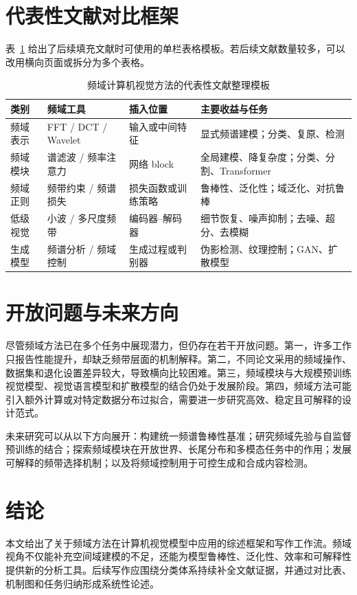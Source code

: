 \documentclass[12pt,a4paper]{article}
\begin{document}
\section{代表性文献对比框架}
表~\ref{tab:taxonomy} 给出了后续填充文献时可使用的单栏表格模板。若后续文献数量较多，可以改用横向页面或拆分为多个表格。

\begin{table}[htbp]
\centering
\caption{频域计算机视觉方法的代表性文献整理模板}
\label{tab:taxonomy}
\vspace{0.5em}
\small
\begin{tabular}{@{}p{2.4cm}p{3.2cm}p{3.0cm}p{3.6cm}@{}}
\toprule
\textbf{类别} & \textbf{频域工具} & \textbf{插入位置} & \textbf{主要收益与任务} \\ \midrule
频域表示 & FFT / DCT / Wavelet & 输入或中间特征 & 显式频谱建模；分类、复原、检测 \\
频域模块 & 谱滤波 / 频率注意力 & 网络 block & 全局建模、降复杂度；分类、分割、Transformer \\
频域正则 & 频带约束 / 频谱损失 & 损失函数或训练策略 & 鲁棒性、泛化性；域泛化、对抗鲁棒 \\
低级视觉 & 小波 / 多尺度频带 & 编码器--解码器 & 细节恢复、噪声抑制；去噪、超分、去模糊 \\
生成模型 & 频谱分析 / 频域控制 & 生成过程或判别器 & 伪影检测、纹理控制；GAN、扩散模型 \\ \bottomrule
\end{tabular}
\end{table}

\section{开放问题与未来方向}
尽管频域方法已在多个任务中展现潜力，但仍存在若干开放问题。第一，许多工作只报告性能提升，却缺乏频带层面的机制解释。第二，不同论文采用的频域操作、数据集和退化设置差异较大，导致横向比较困难。第三，频域模块与大规模预训练视觉模型、视觉语言模型和扩散模型的结合仍处于发展阶段。第四，频域方法可能引入额外计算或对特定数据分布过拟合，需要进一步研究高效、稳定且可解释的设计范式。

未来研究可以从以下方向展开：构建统一频谱鲁棒性基准；研究频域先验与自监督预训练的结合；探索频域模块在开放世界、长尾分布和多模态任务中的作用；发展可解释的频带选择机制；以及将频域控制用于可控生成和合成内容检测。

\section{结论}
本文给出了关于频域方法在计算机视觉模型中应用的综述框架和写作工作流。频域视角不仅能补充空间域建模的不足，还能为模型鲁棒性、泛化性、效率和可解释性提供新的分析工具。后续写作应围绕分类体系持续补全文献证据，并通过对比表、机制图和任务归纳形成系统性论述。
\end{document}

